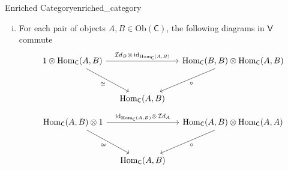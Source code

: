 \begin{definition}{Enriched Category}{enriched_category}
\begin{enumerate}[(i)]
\[\begin{tikzcd}[ampersand replacement=\&, column sep=small]
                    \&                                                                                                                                    \& {\mathrm{Hom}(A,D)} \&                                                                                                               \&                                                                   
\end{tikzcd}
    \]
    \item For each pair of objects $A,B\in \mathrm{Ob}(\mathsf{C})$, the following diagrams in $\mathsf{V}$ commute
    \[
    \begin{tikzcd}[ampersand replacement=\&, column sep=small]
        {1\otimes \mathrm{Hom}_{\mathsf{C}}(A,B)} \arrow[rr, "{{\mathcal{I}d}_B\otimes\,\mathrm{id}_{\mathrm{Hom}_{\mathsf{C}}(A,B)}}"] \arrow[rd, "\cong"'] \&                     \& {\mathrm{Hom}_{\mathsf{C}}(B,B)\otimes \mathrm{Hom}_{\mathsf{C}}(A,B)} \arrow[ld, "\circ"] \\[+10pt]
        \& {\mathrm{Hom}_{\mathsf{C}}(A,B)} \&   
\end{tikzcd}
    \]
    \[
        \begin{tikzcd}[ampersand replacement=\&, column sep=small]
            {\mathrm{Hom}_{\mathsf{C}}(A,B)\otimes 1} \arrow[rr, "\mathrm{id}_{\mathrm{Hom}_{\mathsf{C}}(A,B)}\otimes\,{\mathcal{I}d}_A "] \arrow[rd, "\cong"'] \&                     \& {\mathrm{Hom}_{\mathsf{C}}(A,B)\otimes \mathrm{Hom}_{\mathsf{C}}(A,A)} \arrow[ld, "\circ"] \\[+10pt]
            \& {\mathrm{Hom}_{\mathsf{C}}(A,B)} \&
    \end{tikzcd}
        \]
    \end{enumerate}
\end{definition}


